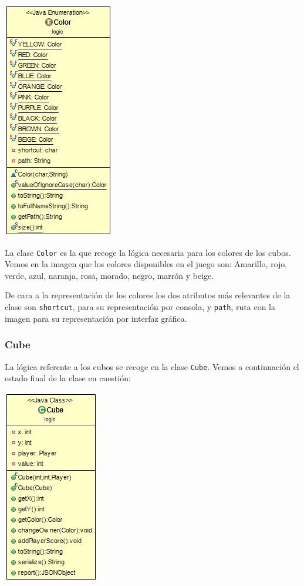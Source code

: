 \documentclass[12pt,a4paper,openright]{book}
\theoremstyle{break}
\begin{document}
\begin{center}
\includegraphics[scale=0.75]{Color-sprint7.png}
\end{center}

La clase \texttt{Color} es la que recoge la lógica necesaria para los colores de los cubos. Vemos en la imagen que los colores disponibles en el juego son: Amarillo, rojo, verde, azul, naranja, rosa, morado, negro, marrón y beige.

De cara a la representación de los colores los dos atributos más relevantes de la clase son \texttt{shortcut}, para su representación por consola, y \texttt{path}, ruta con la imagen para su representación por interfaz gráfica.

\newpage

\subsubsection{Cube}

La lógica referente a los cubos se recoge en la clase \texttt{Cube}.
Vemos a continuación el estado final de la clase en cuestión:

\begin{center}
\includegraphics[scale=0.9]{Cube-sprint7.png} 
\end{center}
\end{document}
